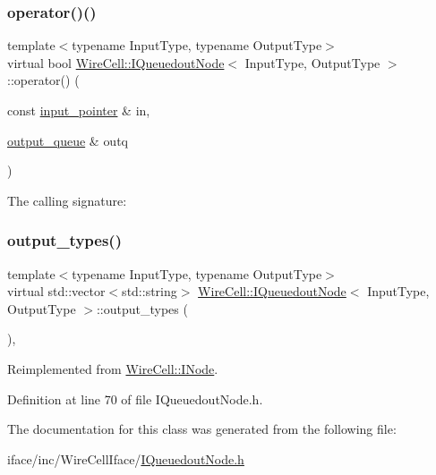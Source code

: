 \subsubsection{\texorpdfstring{operator()()}{operator()()}\hspace{0.1cm}{\footnotesize\ttfamily [2/2]}}
{\footnotesize\ttfamily template$<$typename Input\+Type, typename Output\+Type$>$ \\
virtual bool \hyperlink{class_wire_cell_1_1_i_queuedout_node}{Wire\+Cell\+::\+I\+Queuedout\+Node}$<$ Input\+Type, Output\+Type $>$\+::operator() (\begin{DoxyParamCaption}\item[{const \hyperlink{class_wire_cell_1_1_i_queuedout_node_acf5f716a764553f3c7055a9cf67e906e}{input\+\_\+pointer} \&}]{in,  }\item[{\hyperlink{class_wire_cell_1_1_i_queuedout_node_a39018e4e3dd886befac9636ac791a685}{output\+\_\+queue} \&}]{outq }\end{DoxyParamCaption})\hspace{0.3cm}{\ttfamily [pure virtual]}}



The calling signature\+: 

\mbox{\label{class_wire_cell_1_1_i_queuedout_node_ae80f97293240e876e6d47202e7b3cc59}} 
\subsubsection{\texorpdfstring{output\+\_\+types()}{output\_types()}}
{\footnotesize\ttfamily template$<$typename Input\+Type, typename Output\+Type$>$ \\
virtual std\+::vector$<$std\+::string$>$ \hyperlink{class_wire_cell_1_1_i_queuedout_node}{Wire\+Cell\+::\+I\+Queuedout\+Node}$<$ Input\+Type, Output\+Type $>$\+::output\+\_\+types (\begin{DoxyParamCaption}{ }\end{DoxyParamCaption})\hspace{0.3cm}{\ttfamily [inline]}, {\ttfamily [virtual]}}



Reimplemented from \hyperlink{class_wire_cell_1_1_i_node_aba7e537684cb4f2453796ff73da2d602}{Wire\+Cell\+::\+I\+Node}.



Definition at line 70 of file I\+Queuedout\+Node.\+h.



The documentation for this class was generated from the following file\+:\begin{DoxyCompactItemize}
\item 
iface/inc/\+Wire\+Cell\+Iface/\hyperlink{_i_queuedout_node_8h}{I\+Queuedout\+Node.\+h}\end{DoxyCompactItemize}
